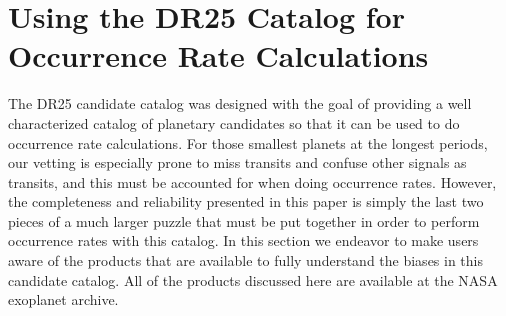 \section{Using the DR25 Catalog for Occurrence Rate Calculations}
\label{s:occurates}
The DR25 candidate catalog was designed with the goal of providing a well characterized catalog of planetary candidates so that it can be used to do occurrence rate calculations.  For those smallest planets at the longest periods, our vetting is especially prone to miss transits and confuse other signals as transits, and this must be accounted for when doing occurrence rates.  However, the completeness and reliability presented in this paper is simply the last two pieces of a much larger puzzle that must be put together in order to perform occurrence rates with this catalog.  In this section we endeavor to make users aware of the products that are available to fully understand the biases in this candidate catalog.  All of the products discussed here are available at the NASA exoplanet archive. 


